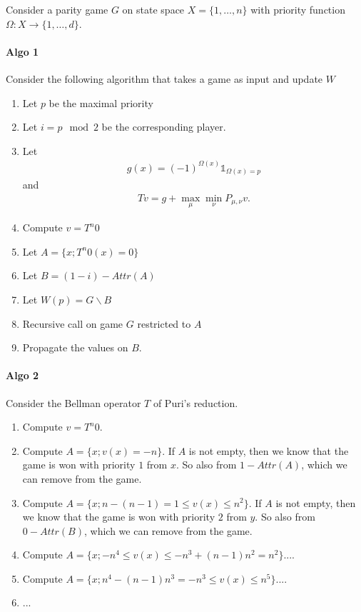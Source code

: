 \documentclass{article}
\def\1{{\mathds 1}}
\begin{document}
Consider a parity game $G$ on state space $X=\{1,\dots,n\}$ with priority function $\Omega:X \to \{1,\dots,d\}$.

\paragraph{Algo 1}

Consider the following algorithm that takes a game as input and update $W$
\begin{enumerate}
\item Let $p$ be the maximal priority
\item Let $i=p \mod 2$ be the corresponding player.
\item Let
  \begin{align}
    g(x) = (-1)^{\Omega(x)} \1_{\Omega(x)=p}
  \end{align}
  and
  \begin{align}
    T v = g + \max_\mu \min_\nu P_{\mu,\nu} v.
  \end{align}
  \item Compute $v=T^n 0$ 
  \item Let $A = \{ x ; T^n0(x)=0 \}$
  \item Let $B = (1-i)-Attr(A)$
  \item Let $W(p) = G \backslash B$
  \item Recursive call on game $G$ restricted to $A$
  \item Propagate the values on $B$.
\end{enumerate}


\paragraph{Algo 2}

Consider the Bellman operator $T$ of Puri's reduction.

\begin{enumerate}
\item Compute $v = T^n 0$.
\item Compute $A=\{ x ; v(x)=-n \}$. If $A$ is not empty, then we know that the game is won with priority $1$ from $x$. So also from $1-Attr(A)$, which we can remove from the game.
\item Compute $A=\{ x ; n-(n-1) = 1 \le v(x) \le n^2 \}$. If $A$ is not empty, then we know that the game is won with priority $2$ from $y$. So also from $0-Attr(B)$, which we can remove from the game.
\item Compute $A=\{ x ; -n^4 \le v(x) \le -n^3+(n-1)n^2=n^2 \}$....
\item Compute $A=\{ x ; n^4-(n-1)n^3 = -n^3 \le v(x) \le n^5 \}$....
\item ...
\end{enumerate}





 
\end{document}
